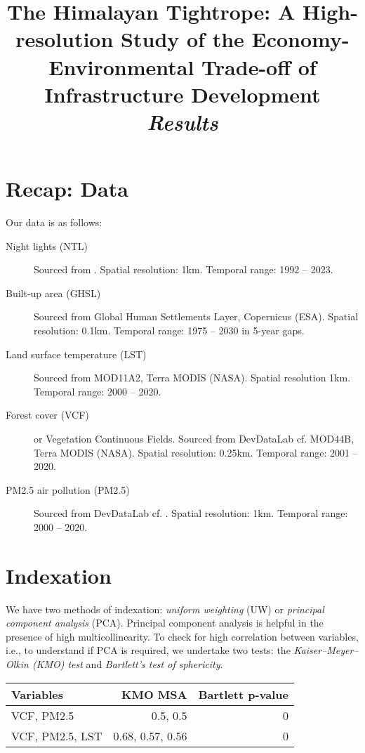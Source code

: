 \documentclass[a4paper,12pt]{article} %
\begin{document}
\title{The Himalayan Tightrope: A High-resolution Study of the Economy-Environmental Trade-off of Infrastructure Development \\[1em]\textit{Results}}
\date{}
\maketitle

\section{Recap: Data}

Our data is as follows:

\begin{description}
    \item[Night lights (NTL)] Sourced from \textcite{Li2020ntl}. Spatial resolution: 1km. Temporal range: 1992 -- 2023.
    \item[Built-up area (GHSL)] Sourced from Global Human Settlements Layer, Copernicus (ESA). Spatial resolution: 0.1km. Temporal range: 1975 -- 2030 in 5-year gaps.
    \item[Land surface temperature (LST)] Sourced from MOD11A2, Terra MODIS (NASA). Spatial resolution 1km. Temporal range: 2000 -- 2020.
    \item[Forest cover (VCF)] or Vegetation Continuous Fields. Sourced from DevDataLab cf. MOD44B, Terra MODIS (NASA). Spatial resolution: 0.25km. Temporal range: 2001 -- 2020. 
    \item[PM2.5 air pollution (PM2.5)] Sourced from DevDataLab cf. \textcite{van2021pm25}. Spatial resolution: 1km. Temporal range: 2000 -- 2020.
\end{description}

\section{Indexation}

We have two methods of indexation: \textit{uniform weighting} (UW) or \textit{principal component analysis} (PCA). Principal component analysis is helpful in the presence of high multicollinearity. To check for high correlation between variables, i.e., to understand if PCA is required, we undertake two tests: the \textit{Kaiser–Meyer–Olkin (KMO) test} and \textit{Bartlett's test of sphericity}.

\begin{table}[H]
\centering\begin{tabular}{l|r|r}
    Variables       &   KMO MSA         &   Bartlett p-value        \\
    \hline 
    VCF, PM2.5      &   0.5, 0.5        &   0                       \\
    VCF, PM2.5, LST &   0.68, 0.57, 0.56&   0                       \\
    

\end{tabular}
\end{table}
\end{document}
